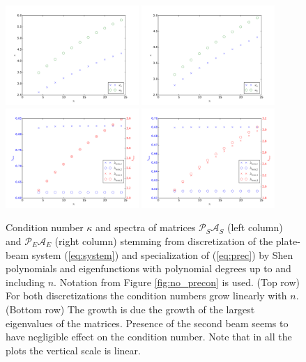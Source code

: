 \documentclass{marine_2015}
\begin{document}
 \begin{figure}[t!]
 \centering
 \includegraphics[width=0.45\textwidth]{img/Precond_shen_cond}
 \includegraphics[width=0.45\textwidth]{img/Precond_sine_cond}\\
 \includegraphics[width=0.45\textwidth]{img/prec_shen_spectrum}
 \includegraphics[width=0.45\textwidth]{img/prec_sine_spectrum}\\
 \caption{
   Condition number $\kappa$ and spectra of matrices
   $\mathcal{P}_S\mathcal{A}_S$
   (left column) and $\mathcal{P}_E\mathcal{A}_E$ (right column) stemming from discretization 
   of the plate-beam system (\ref{eq:system}) and specialization of
   (\ref{eq:prec}) by Shen polynomials and eigenfunctions with polynomial degrees 
   up to and including $n$. Notation from Figure \ref{fig:no_precon} is used. (Top row) 
   For both discretizations the condition numbers grow linearly with $n$. (Bottom row) 
   The growth is due the growth of the largest eigenvalues of the matrices. Presence 
   of the second beam seems to have negligible effect on the condition number.
   Note that in all the plots the vertical scale is linear.}
 \label{fig:precond}
 \end{figure}
\end{document}
